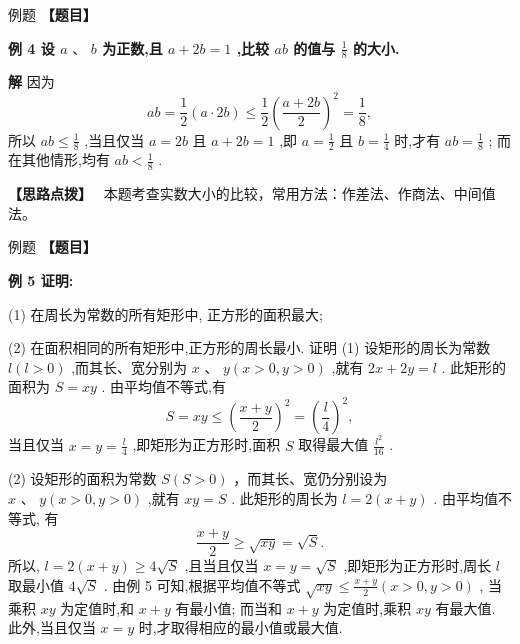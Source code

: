 \documentclass[a4paper,10pt,oneside,fontset=none]{ctexbook}
\renewcommand{\geq}{\geqslant}
\renewcommand{\leq}{\leqslant}
\newcounter{example}[chapter]
\newenvironment{example}[1][]{\begin{exBox}{例题}{#1}}{\end{exBox}}
\numberwithin{equation}{chapter}
\newenvironment{solution}{\begin{solutionBox}}{\end{solutionBox}}
\newenvironment{hint}{\begin{hintBox}\textbf{【思路点拨】}~}{\end{hintBox}}
\begin{document}
\begin{example}
\textbf{【题目】}\par\vspace{0.3em}
\textbf{例 4 设 $a\text{ 、 }b$ 为正数,且 $a + {2b} = 1$ ,比较 ${ab}$ 的值与 $\frac{1}{8}$ 的大小.}\par\vspace{0.3em}
\end{example}

\begin{solution}
\textbf{解}
因为
$$
{ab} = \frac{1}{2}\left( {a \cdot  {2b}}\right)  \leq  \frac{1}{2}{\left( \frac{a + {2b}}{2}\right) }^{2} = \frac{1}{8},
$$
所以 ${ab} \leq  \frac{1}{8}$ ,当且仅当 $a = {2b}$ 且 $a + {2b} = 1$ ,即 $a = \frac{1}{2}$ 且 $b = \frac{1}{4}$ 时,才有 ${ab} = \frac{1}{8}$ ; 而在其他情形,均有 ${ab} < \frac{1}{8}$ .
\end{solution}

\begin{hint}
本题考查实数大小的比较，常用方法：作差法、作商法、中间值法。
\end{hint}

\begin{example}
\textbf{【题目】}\par\vspace{0.3em}
\textbf{例 5 证明:}\par\vspace{0.3em}
\par
(1) 在周长为常数的所有矩形中, 正方形的面积最大;
\par
(2) 在面积相同的所有矩形中,正方形的周长最小.
证明 (1) 设矩形的周长为常数 $l\left( {l > 0}\right)$ ,而其长、宽分别为 $x\text{ 、 }y\left( {x > 0, y > 0}\right)$ ,就有 ${2x} + {2y} = l$ . 此矩形的面积为 $S = {xy}$ . 由平均值不等式,有
$$
S = {xy} \leq  {\left( \frac{x + y}{2}\right) }^{2} = {\left( \frac{l}{4}\right) }^{2},
$$
当且仅当 $x = y = \frac{l}{4}$ ,即矩形为正方形时,面积 $S$ 取得最大值 $\frac{{l}^{2}}{16}$ .
\par
(2) 设矩形的面积为常数 $S\left( {S > 0}\right)$ ，而其长、宽仍分别设为 $x\text{ 、 }y\left( {x > 0, y > 0}\right)$ ,就有 ${xy} = S$ . 此矩形的周长为 $l = 2\left( {x + y}\right)$ . 由平均值不等式, 有
$$
\frac{x + y}{2} \geq  \sqrt{xy} = \sqrt{S}.
$$
所以, $l = 2\left( {x + y}\right)  \geq  4\sqrt{S}$ ,且当且仅当 $x = y = \sqrt{S}$ ,即矩形为正方形时,周长 $l$ 取最小值 $4\sqrt{S}$ .
由例 5 可知,根据平均值不等式 $\sqrt{xy} \leq  \frac{x + y}{2}\left( {x > 0, y > 0}\right)$ , 当乘积 ${xy}$ 为定值时,和 $x + y$ 有最小值; 而当和 $x + y$ 为定值时,乘积 ${xy}$ 有最大值. 此外,当且仅当 $x = y$ 时,才取得相应的最小值或最大值.
\end{example}
\end{document}
